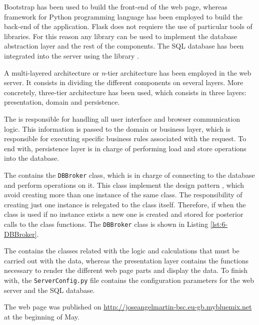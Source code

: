 Bootstrap has been used to build the front-end of the web page, whereas  framework \cite{Gri14} for Python programming language has been employed to build the back-end of the application. Flask does not requiere the use of particular tools of libraries. For this reason any library can be used to implement the database abstraction layer and the rest of the components. The SQL database has been integrated into the server using the  library \cite{Mat16}. 

A multi-layered architecture or \textit{n}-tier architecture has been employed in the web server. It consists in dividing the different components on several layers. More concretely, three-tier architecture has been used, which consists in three layers: presentation, domain and persistence.

The  is responsible for handling all user interface and browser communication logic. This information is passed to the domain or business layer, which is responsible for executing specific business rules associated with the request. To end with, persistence layer is in charge of performing load and store operations into the database.


The  contains the \texttt{DBBroker} class, which is in charge of connecting to the database and perform operations on it. This class implement the  design pattern \cite{Vil07}, which avoid creating more than one instance of the same class. The responsibility of creating just one instance is relegated to the class itself. Therefore, if when the class is used if no instance exists a new one is created and stored for posterior calls to the class functions. The \texttt{DBBroker} class is shown in Listing \ref{lst:6-DBBroker}.

The  contains the classes related with the logic and calculations that must be carried out with the data, whereas the presentation layer contains the functions necessary to render the different web page parts and display the data. To finish with, the \texttt{ServerConfig.py} file contains the configuration parameters for the web server and the SQL database.

The web page was published on \url{http://joseangelmartin-bsc.eu-gb.mybluemix.net} at the beginning of May.




